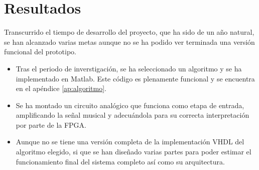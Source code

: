 \section{Resultados}
Transcurrido el tiempo de desarrollo del proyecto, que ha sido de un año natural, se han alcanzado varias metas aunque no se ha podido ver terminada una versión funcional del prototipo. 
\begin{itemize}
\item Tras el periodo de inverstigación, se ha seleccionado un algoritmo y se ha implementado en Matlab. Este código es plenamente funcional y se encuentra en el apéndice \ref{ap:algoritmo}.
\item Se ha montado un circuito analógico que funciona como etapa de entrada, amplificando la señal musical y adecuándola para su correcta interpretación por parte de la FPGA.
\item Aunque no se tiene una versión completa de la implementación VHDL del algoritmo elegido, si que se han diseñado varias partes para poder estimar el funcionamiento final del sistema completo así como su arquitectura.
\end{itemize}

